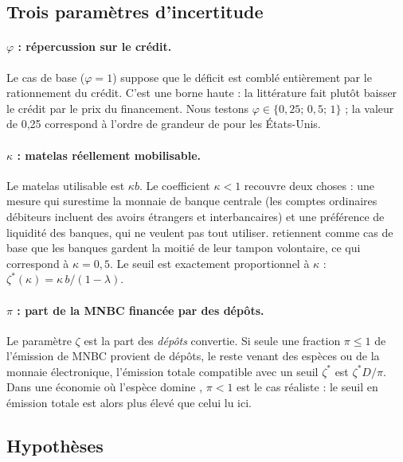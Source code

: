 \documentclass[11pt,a4paper]{article}
\newcommand{\zs}{\zeta^{*}}
\begin{document}
	\subsection{Trois paramètres d'incertitude}\label{sec:incertitude}
	
	\paragraph{$\varphi$ : répercussion sur le crédit.} Le cas de base ($\varphi=1$) suppose que le déficit est comblé entièrement par le rationnement du crédit. C'est une borne haute : la littérature fait plutôt baisser le crédit par le prix du financement. Nous testons $\varphi\in\{0{,}25;\,0{,}5;\,1\}$ ; la valeur de 0,25 correspond à l'ordre de grandeur de \citet{whited2023} pour les États-Unis.
	
	\paragraph{$\kappa$ : matelas réellement mobilisable.} Le matelas utilisable est $\kappa b$. Le coefficient $\kappa<1$ recouvre deux choses : une mesure qui surestime la monnaie de banque centrale (les comptes ordinaires débiteurs incluent des avoirs étrangers et interbancaires) et une préférence de liquidité des banques, qui ne veulent pas tout utiliser. \citet{meller2023} retiennent comme cas de base que les banques gardent la moitié de leur tampon volontaire, ce qui correspond à $\kappa=0{,}5$. Le seuil est exactement proportionnel à $\kappa$ : $\zs(\kappa)=\kappa\,b/(1-\lambda)$.
	
	\paragraph{$\pi$ : part de la MNBC financée par des dépôts.} Le paramètre $\zeta$ est la part des \emph{dépôts} convertie. Si seule une fraction $\pi\le1$ de l'émission de MNBC provient de dépôts, le reste venant des espèces ou de la monnaie électronique, l'émission totale compatible avec un seuil $\zs$ est $\zs D/\pi$. Dans une économie où l'espèce domine \citep{bouis2024}, $\pi<1$ est le cas réaliste : le seuil en émission totale est alors plus élevé que celui lu ici.
	
	\subsection{Hypothèses}
	
\end{document}
